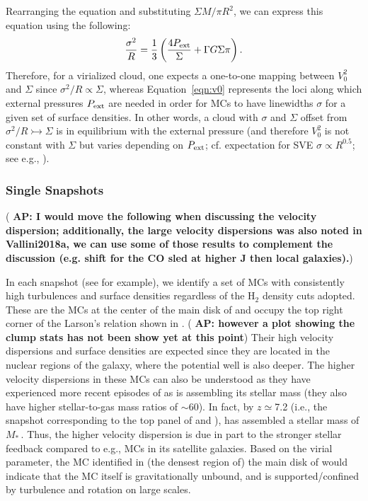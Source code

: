 \documentclass[iop]{emulateapj} %
\newcommand{\AP}[1]{({\bf \color{apcolor} AP: #1})}
\begin{document}
Rearranging the equation and substituting $\Sigma$\eq$M/\pi R^2$, we can express
this equation using the following:
\begin{equation}
\frac{\sigma^2}{R} = \frac{1}{3}\left(\frac{4P_{\rm ext}}{\Sigma} + \Gamma G \Sigma \pi \right).
\label{eqn:v0}
\end{equation}
Therefore, for a virialized cloud, one expects a one-to-one mapping between $V_0^2$ and $\Sigma$ since
$\sigma^2/R\propto\Sigma$, whereas
Equation~\ref{eqn:v0} represents the loci along which external pressures $P_{\rm ext}$ are
needed in order for MCs to have linewidths $\sigma$ for a given set of surface densities.
In other words, a cloud with $\sigma$ and $\Sigma$ offset from $\sigma^2/R\rightarrowtail\Sigma$
is in equilibrium with the external pressure (and therefore $V_0^2$ is not constant with $\Sigma$ but
varies depending on $P_{\rm ext}$; cf. expectation for SVE
$\sigma\propto R^{0.5}$; see e.g., \citealt{Heyer09a, Hughes10a, Hughes13b, Meidt13a}).


\subsubsection{Single Snapshots}  \label{sec:singless}

%
\AP{I would move the following when discussing the velocity dispersion; additionally, the large velocity dispersions was also noted in Vallini2018a, we can use some of those results to complement the discussion (e.g. shift for the CO sled at higher J then local galaxies).}

In each snapshot (see  for example),
we identify a set of MCs with consistently high turbulences and surface densities
regardless of the H$_2$ density cuts adopted.
These are the MCs at the center of the main disk of \flower and
occupy the top right corner of the Larson's relation shown in .
\AP{however a plot showing the clump stats has not been show yet at this point}
Their high velocity dispersions and surface densities are expected since
they are located in the nuclear regions of the
galaxy, where the potential well is also deeper. The higher velocity dispersions
in these MCs can also be understood as they have experienced more recent episodes
of \SF as \flower is assembling its stellar mass (they also have higher stellar-to-gas mass ratios of $\sim$60).
In fact, by $z\simeq$7.2 (i.e., the snapshot corresponding
to the top panel of  and ), \flower has assembled
a stellar mass of $M_*$\,\Msun. Thus, the higher velocity dispersion
is due in part to the stronger stellar feedback compared to e.g., MCs in its satellite galaxies.
Based on the virial parameter, the MC identified in (the densest region of) the main disk of \flower
would indicate that the MC itself is gravitationally unbound, and is supported/confined 
by turbulence and rotation on large scales.
\end{document}
